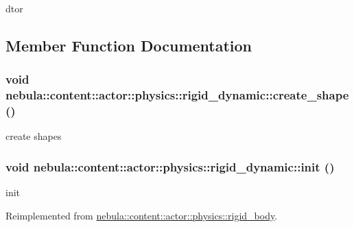 dtor 

\subsection{Member Function Documentation}
\hypertarget{classnebula_1_1content_1_1actor_1_1physics_1_1rigid__dynamic_ad59b3dbeace9a34450aa6d81af4a3049}{
\subsubsection[{create\_\-shape}]{\setlength{\rightskip}{0pt plus 5cm}void nebula::content::actor::physics::rigid\_\-dynamic::create\_\-shape ()}}
\label{classnebula_1_1content_1_1actor_1_1physics_1_1rigid__dynamic_ad59b3dbeace9a34450aa6d81af4a3049}


create shapes \hypertarget{classnebula_1_1content_1_1actor_1_1physics_1_1rigid__dynamic_ae9450372c5f60103573ed626ffda9532}{
\subsubsection[{init}]{\setlength{\rightskip}{0pt plus 5cm}void nebula::content::actor::physics::rigid\_\-dynamic::init ()}}
\label{classnebula_1_1content_1_1actor_1_1physics_1_1rigid__dynamic_ae9450372c5f60103573ed626ffda9532}


init 

Reimplemented from \hyperlink{classnebula_1_1content_1_1actor_1_1physics_1_1rigid__body_a858ee11f899acf3cc8f94eccf5713384}{nebula::content::actor::physics::rigid\_\-body}.

